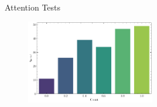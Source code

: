 \begin{frame}{Attention Tests}

\begin{figure}[!htb]
\centering
\includegraphics[width=0.5\textwidth]{Images/results_attn_tests.pdf}
\label{fig:results_attn_tests}
\end{figure}

    
\end{frame}
